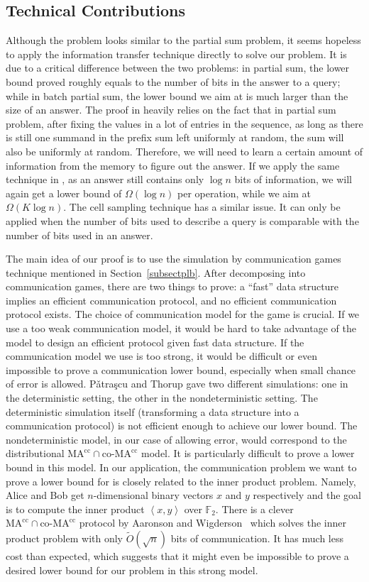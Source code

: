 \documentclass[11pt]{article}
\begin{document}
\subsection{Technical Contributions}\label{subsecttc}
Although the \bps{} problem looks similar to the partial sum problem, it seems hopeless to apply the information transfer technique directly to solve our problem. It is due to a critical difference between the two problems: in partial sum, the lower bound proved roughly equals to the number of bits in the answer to a query; while in batch partial sum, the lower bound we aim at is much larger than the size of an answer. The proof in \cite{PD04a} heavily relies on the fact that in partial sum problem, after fixing the values in a lot of entries in the sequence, as long as there is still one summand in the prefix sum left uniformly at random, the sum will also be uniformly at random. Therefore, we will need to learn a certain amount of information from the memory to figure out the answer. If we apply the same technique in \bps{}, as an answer still contains only $\log n$ bits of information, we will again get a lower bound of $\Omega(\log n)$ per operation, while we aim at $\Omega(K\log n)$. The cell sampling technique has a similar issue. It can only be applied when the number of bits used to describe a query is comparable with the number of bits used in an answer. 

The main idea of our proof is to use the simulation by communication games technique mentioned in Section~\ref{subsectplb}. After decomposing into communication games, there are two things to prove: a ``fast'' data structure implies an efficient communication protocol, and no efficient communication protocol exists. The choice of communication model for the game is crucial. If we use a too weak communication model, it would be hard to take advantage of the model to design an efficient protocol given fast data structure. If the communication model we use is too strong, it would be difficult or even impossible to prove a communication lower bound, especially when small chance of error is allowed. P\v{a}tra\c{s}cu and Thorup gave two different simulations: one in the deterministic setting, the other in the nondeterministic setting. The deterministic simulation itself (transforming a data structure into a communication protocol) is not efficient enough to achieve our lower bound. The nondeterministic model, in our case of allowing error, would correspond to the distributional $\mathrm{MA^{cc}}\cap \textrm{co-}\mathrm{MA^{cc}}$ model. It is particularly difficult to prove a lower bound in this model. In our application, the communication problem we want to prove a lower bound for is closely related to the inner product problem. Namely, Alice and Bob get $n$-dimensional binary vectors $x$ and $y$ respectively and the goal is to compute the inner product $\left<x, y\right>$ over $\mathbb{F}_2$. There is a clever $\mathrm{MA^{cc}}\cap \textrm{co-}\mathrm{MA^{cc}}$ protocol by Aaronson and Wigderson~\cite{AW08} which solves the inner product problem with only $\tilde{O}(\sqrt{n})$ bits of communication. It has much less cost than expected, which suggests that it might even be impossible to prove a desired lower bound for our problem in this strong model. 
\end{document}
